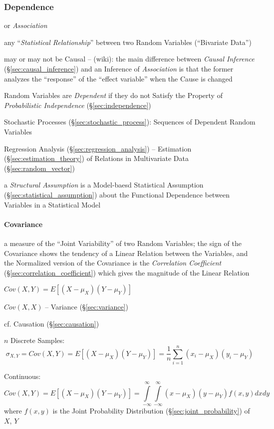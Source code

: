 \subsubsection{Dependence}\label{sec:dependence}

or \emph{Association}

any ``\emph{Statistical Relationship}'' between two Random Variables
(``Bivariate Data'')

may or may not be Causal -- (wiki): the main difference between
\emph{Causal Inference} (\S\ref{sec:causal_inference}) and an Inference of
\emph{Association} is that the former analyzes the ``response'' of the ``effect
variable'' when the Cause is changed

Random Variables are \emph{Dependent} if they do not Satisfy the Property of
\emph{Probabilistic Independence} (\S\ref{sec:independence})

Stochastic Processes (\S\ref{sec:stochastic_process}): Sequences of Dependent
Random Variables

\fist Regression Analysis (\S\ref{sec:regression_analysis}) -- Estimation
(\S\ref{sec:estimation_theory}) of Relations in Multivariate Data
(\S\ref{sec:random_vector})

\fist a \emph{Structural Assumption} is a Model-baesd Statistical Assumption
(\S\ref{sec:statistical_assumption}) about the Functional Dependence between
Variables in a Statistical Model



\paragraph{Covariance}\label{sec:covariance}\hfill

a measure of the ``Joint Variability'' of two Random Variables; the sign of the
Covariance shows the tendency of a Linear Relation between the Variables, and
the Normalized version of the Covariance is the \emph{Correlation Coefficient}
(\S\ref{sec:correlation_coefficient}) which gives the magnitude of the Linear
Relation

$Cov(X,Y) = E [(X - \mu_X)(Y - \mu_Y)]$

$Cov(X,X)$ -- Variance (\S\ref{sec:variance})

\fist cf. Causation (\S\ref{sec:causation})

$n$ Discrete Samples:
\[
  \sigma_{X,Y} = Cov(X,Y) = E [(X - \mu_X)(Y - \mu_Y)] =
    \frac{1}{n} \sum_{i=1}^n (x_i - \mu_X) (y_i - \mu_Y)
\]

Continuous:
\[
  Cov(X,Y) = E [(X - \mu_X)(Y - \mu_Y)] =
  \int\limits_{-\infty}^{\infty} \int\limits_{-\infty}^{\infty}
  (x - \mu_X) (y - \mu_Y) f(x,y) dx dy
\]
where $f(x,y)$ is the Joint Probability Distribution
(\S\ref{sec:joint_probability}) of $X$, $Y$

